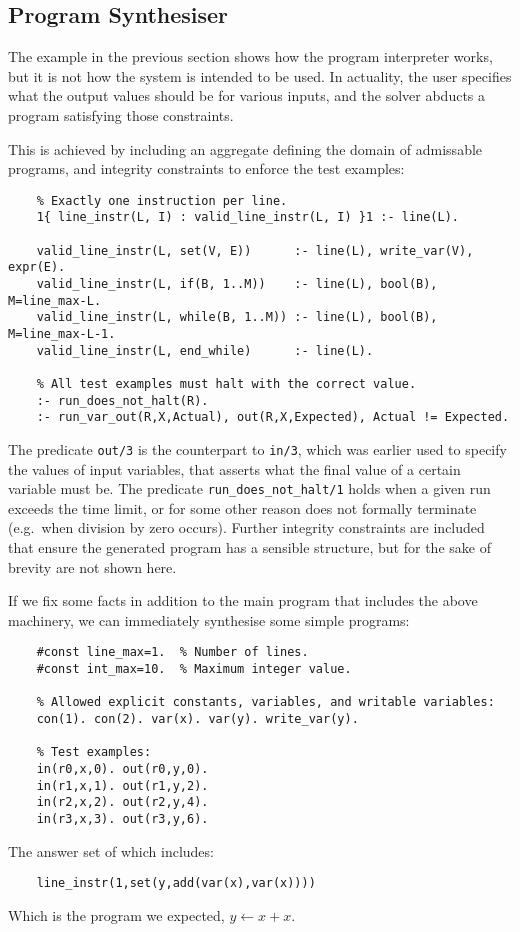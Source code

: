 \documentclass[a4paper,twoside,notitlepage]{article}
\newcommand{\ttt}{\texttt}
\begin{document}
\subsection{Program Synthesiser} \label{sec:prgsyn}

The example in the previous section shows how the program interpreter 
works, but it is not how the system is intended to be used. In actuality, 
the user specifies what the output values should be for various inputs, 
and the solver abducts a program satisfying those constraints.

This is achieved by including an aggregate defining the domain of 
admissable programs, and integrity constraints to enforce the test 
examples:
\begin{verbatim}
    % Exactly one instruction per line.
    1{ line_instr(L, I) : valid_line_instr(L, I) }1 :- line(L).
    
    valid_line_instr(L, set(V, E))      :- line(L), write_var(V), expr(E).
    valid_line_instr(L, if(B, 1..M))    :- line(L), bool(B), M=line_max-L.
    valid_line_instr(L, while(B, 1..M)) :- line(L), bool(B), M=line_max-L-1.
    valid_line_instr(L, end_while)      :- line(L).
    
    % All test examples must halt with the correct value.
    :- run_does_not_halt(R).
    :- run_var_out(R,X,Actual), out(R,X,Expected), Actual != Expected.
\end{verbatim}
The predicate \ttt{out/3} is the counterpart to \ttt{in/3}, which was 
earlier used to specify the values of input variables, that asserts what 
the final value of a certain variable must be. The predicate 
\ttt{run\_does\_not\_halt/1} holds when a given run exceeds the time 
limit, or for some other reason does not formally terminate (e.g.\ when 
division by zero occurs). Further integrity constraints are included that 
ensure the generated program has a sensible structure, but for the sake of 
brevity are not shown here.

If we fix some facts in addition to the main program that includes the 
above machinery, we can immediately synthesise some simple programs:
\begin{verbatim}
    #const line_max=1.  % Number of lines.
    #const int_max=10.  % Maximum integer value.

    % Allowed explicit constants, variables, and writable variables:
    con(1). con(2). var(x). var(y). write_var(y).
    
    % Test examples:
    in(r0,x,0). out(r0,y,0).
    in(r1,x,1). out(r1,y,2).
    in(r2,x,2). out(r2,y,4).
    in(r3,x,3). out(r3,y,6).
\end{verbatim}
The answer set of which includes:
\begin{verbatim}
    line_instr(1,set(y,add(var(x),var(x))))
\end{verbatim}
Which is the program we expected, $y \gets x + x$.
\end{document}
